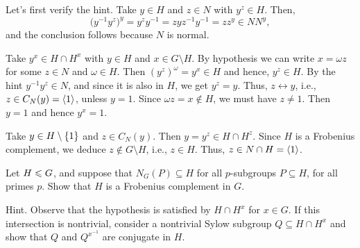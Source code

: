 \begin{solution} Let's first verify the hint. Take $y\in H$ and $z\in N$ with $y^z\in H$. Then,
$$
    \big(y^{-1}y^z\big)^y
        =y^zy^{-1}
        =zyz^{-1}y^{-1}
        =zz^y\in NN^y,
$$
and the conclusion follows because $N$ is normal.
\begin{description}[leftmargin=!,labelwidth=\widthof{\it if:}]
    \item[\textrm{\upshape{\it if\/} part:}] Take $y^x\in H\cap H^x$ with $y
    \in H$ and $x\in G\setminus H$. By hypothesis we can write $x=\omega z$ for some $z\in N$ and $\omega\in H$. Then $(y^z)^\omega=y^x\in H$ and hence, $y^z\in H$. By the hint $y^{-1}y^z\in N$, and since it is also in $H$, we get $y^z=y$. Thus, $z\leftrightarrow y$, i.e., $z\in C_N(y)=\langle1\rangle$, unless $y=1$. Since $\omega z=x\notin H$, we must have $z\ne1$. Then $y=1$ and hence $y^x=1$.
    \item[\textrm{\upshape{\it only if\/}:}]  Take $y\in H\setminus\{1\}$ and $z\in C_N(y)$. Then $y=y^z\in H\cap H^z$. Since $H$ is a Frobenius complement, we deduce $z\notin G\setminus H$, i.e., $z\in H$. Thus, $z\in N\cap H=\langle1\rangle$.
\end{description}
\end{solution}

\begin{probl}
    Let $H\leqslant G$, and suppose that $N_G(P)\subseteq H$ for all $p$-subgroups $P \subseteq H$, for all primes $p$. Show that\/ $H$ is a Frobenius complement in\/ $G$.

    \textrm{\upshape Hint. Observe that the hypothesis is satisfied by $H \cap H^x$ for $x \in G$. If this intersection is nontrivial, consider a nontrivial Sylow subgroup $Q \subseteq H \cap H^x$ and show that $Q$ and $Q^{x^{-1}}$ are conjugate in $H$.}
\end{probl}

